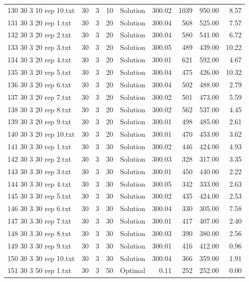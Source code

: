 \begin{longtable}{lrrllrrrr}
130 30 3 10 rep 10.txt & 30 & 3 & 10 & Solution & 300.02 & 1039 & 950.00 &  8.57\\
131 30 3 20 rep 1.txt & 30 & 3 & 20 & Solution & 300.04 & 568 & 525.00 &  7.57\\
132 30 3 20 rep 2.txt & 30 & 3 & 20 & Solution & 300.04 & 580 & 541.00 &  6.72\\
133 30 3 20 rep 3.txt & 30 & 3 & 20 & Solution & 300.05 & 489 & 439.00 & 10.22\\
134 30 3 20 rep 4.txt & 30 & 3 & 20 & Solution & 300.01 & 621 & 592.00 &  4.67\\
135 30 3 20 rep 5.txt & 30 & 3 & 20 & Solution & 300.04 & 475 & 426.00 & 10.32\\
136 30 3 20 rep 6.txt & 30 & 3 & 20 & Solution & 300.04 & 502 & 488.00 &  2.79\\
137 30 3 20 rep 7.txt & 30 & 3 & 20 & Solution & 300.02 & 501 & 473.00 &  5.59\\
138 30 3 20 rep 8.txt & 30 & 3 & 20 & Solution & 300.02 & 562 & 537.00 &  4.45\\
139 30 3 20 rep 9.txt & 30 & 3 & 20 & Solution & 300.01 & 498 & 485.00 &  2.61\\
140 30 3 20 rep 10.txt & 30 & 3 & 20 & Solution & 300.01 & 470 & 453.00 &  3.62\\
141 30 3 30 rep 1.txt & 30 & 3 & 30 & Solution & 300.02 & 446 & 424.00 &  4.93\\
142 30 3 30 rep 2.txt & 30 & 3 & 30 & Solution & 300.03 & 328 & 317.00 &  3.35\\
143 30 3 30 rep 3.txt & 30 & 3 & 30 & Solution & 300.01 & 450 & 440.00 &  2.22\\
144 30 3 30 rep 4.txt & 30 & 3 & 30 & Solution & 300.05 & 342 & 333.00 &  2.63\\
145 30 3 30 rep 5.txt & 30 & 3 & 30 & Solution & 300.02 & 435 & 424.00 &  2.53\\
146 30 3 30 rep 6.txt & 30 & 3 & 30 & Solution & 300.04 & 330 & 305.00 &  7.58\\
147 30 3 30 rep 7.txt & 30 & 3 & 30 & Solution & 300.01 & 417 & 407.00 &  2.40\\
148 30 3 30 rep 8.txt & 30 & 3 & 30 & Solution & 300.03 & 390 & 380.00 &  2.56\\
149 30 3 30 rep 9.txt & 30 & 3 & 30 & Solution & 300.01 & 416 & 412.00 &  0.96\\
150 30 3 30 rep 10.txt & 30 & 3 & 30 & Solution & 300.04 & 366 & 359.00 &  1.91\\
151 30 3 50 rep 1.txt & 30 & 3 & 50 & Optimal &  0.11 & 252 & 252.00 &  0.00\\

\end{longtable}
